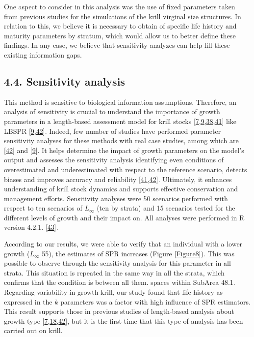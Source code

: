 \documentclass[
]{article}
\begin{document}
One aspect to consider in this analysis was the use of fixed parameters
taken from previous studies for the simulations of the krill virginal
size structures. In relation to this, we believe it is necessary to
obtain of specific life history and maturity parameters by stratum,
which would allow us to better define these findings. In any case, we
believe that sensitivity analyzes can help fill these existing
information gaps.

\hypertarget{sensitivity-analysis}{%
\subsection{4.4. Sensitivity analysis}\label{sensitivity-analysis}}

This method is sensitive to biological information assumptions.
Therefore, an analysis of sensitivity is crucial to understand the
importance of growth parameters in a length-based assessment model for
krill stocks
{[}\protect\hyperlink{ref-Rudd2017a}{7},\protect\hyperlink{ref-Hordyk2016}{9},\protect\hyperlink{ref-Chong2019}{38},\protect\hyperlink{ref-Carvalho2017}{41}{]}
like LBSPR
{[}\protect\hyperlink{ref-Hordyk2016}{9},\protect\hyperlink{ref-Cousido-Rocha2022}{42}{]}.
Indeed, few number of studies have performed parameter sensitivity
analyses for these methods with real case studies, among which are
{[}\protect\hyperlink{ref-Cousido-Rocha2022}{42}{]} and
{[}\protect\hyperlink{ref-Hordyk2016}{9}{]}. It helps determine the
impact of growth parameters on the model's output and assesses the
sensitivity analysis identifying even conditions of overestimated and
underestimated with respect to the reference scenario, detects biases
and improves accuracy and reliability
{[}\protect\hyperlink{ref-Carvalho2017}{41},\protect\hyperlink{ref-Cousido-Rocha2022}{42}{]}.
Ultimately, it enhances understanding of krill stock dynamics and
supports effective conservation and management efforts. Sensitivity
analyses were 50 scenarios performed with respect to ten scenarios of
\(L_{\infty}\) (ten by strata) and 15 scenarios tested for the different
levels of growth and their impact on. All analyses were performed in R
version 4.2.1. {[}\protect\hyperlink{ref-RCRAN2022}{43}{]}.

According to our results, we were able to verify that an individual with
a lower growth (\(L_{\infty}\) 55), the estimates of SPR increases
(Figure \ref{Figure8}). This was possible to observe through the
sensitivity analysis for this parameter in all strata. This situation is
repeated in the same way in all the strata, which confirms that the
condition is between all them. spaces within SubArea 48.1. Regarding
variability in growth krill, our study found that life history as
expressed in the \(k\) parameters was a factor with high influence of
SPR estimators. This result supports those in previous studies of
length-based analysis about growth type
{[}\protect\hyperlink{ref-Rudd2017a}{7},\protect\hyperlink{ref-Prince2018}{18},\protect\hyperlink{ref-Cousido-Rocha2022}{42}{]},
but it is the first time that this type of analysis has been carried out
on krill.
\end{document}
